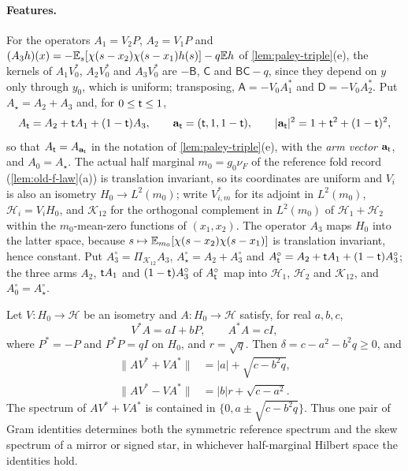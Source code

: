 \paragraph{Features.}
For the operators $A_1=V_2P$, $A_2=V_1P$ and
$(A_3h)(x)=-\mathbb E_s[\chi(s-x_2)\chi(s-x_1)h(s)]-q\mathbb E h$ of
\cref{lem:paley-triple}(e), the kernels of $A_1V_0^*$, $A_2V_0^*$ and $A_3V_0^*$
are $-\mathsf B$, $\mathsf C$ and $\mathsf B\mathsf C-q$, since they depend on
$y$ only through $y_0$, which is uniform; transposing, $\mathsf A=-V_0A_1^*$
and $\mathsf D=-V_0A_2^*$. Put $A_\star=A_2+A_3$ and, for $0\le\mathsf t\le1$,
\[
 A_\mathsf t=A_2+\mathsf t A_1+(1-\mathsf t)A_3,\qquad
 \mathbf a_\mathsf t=(\mathsf t,1,1-\mathsf t),\qquad
 |\mathbf a_\mathsf t|^2=1+\mathsf t^2+(1-\mathsf t)^2,
\]
so that $A_\mathsf t=A_{\mathbf a_\mathsf t}$ in the notation of
\cref{lem:paley-triple}(e), with the \emph{arm vector} $\mathbf a_\mathsf t$, and
$A_0=A_\star$. The actual half marginal $m_0=g_0\nu_F$ of the reference fold
record (\cref{lem:old-f-law}(a)) is translation invariant, so its coordinates
are uniform and $V_i$ is also an isometry $H_0\to L^2(m_0)$; write $V_{i,m}^*$
for its adjoint in $L^2(m_0)$, $\mathcal H_i=V_iH_0$, and $\mathcal K_{12}$ for
the orthogonal complement in $L^2(m_0)$ of $\mathcal H_1+\mathcal H_2$ within
the $m_0$-mean-zero functions of $(x_1,x_2)$. The operator $A_3$ maps $H_0$
into the latter space, because $s\mapsto\mathbb E_{m_0}[\chi(s-x_2)\chi(s-x_1)]$ is
translation invariant, hence constant. Put $A_3^\circ=\Pi_{\mathcal K_{12}}A_3$,
$A_\star^\circ=A_2+A_3^\circ$ and
$A^\circ_\mathsf t=A_2+\mathsf t A_1+(1-\mathsf t)A_3^\circ$; the three arms $A_2$,
$\mathsf t A_1$ and $(1-\mathsf t)A_3^\circ$ of $A^\circ_\mathsf t$ map into $\mathcal H_1$,
$\mathcal H_2$ and $\mathcal K_{12}$, and $A^\circ_0=A^\circ_\star$.

\begin{lemma}\label{lem:two-feature-spectrum}
Let $V\colon H_0\to\mathcal H$ be an isometry and $A\colon H_0\to\mathcal H$
satisfy, for real $a,b,c$,
\[
 V^*A=aI+bP,\qquad A^*A=cI,
\]
where $P^*=-P$ and $P^*P=qI$ on $H_0$, and $r=\sqrt q$. Then
$\delta=c-a^2-b^2q\ge0$, and
\begin{align*}
 \|AV^*+VA^*\|&=|a|+\sqrt{c-b^2q},\\
 \|AV^*-VA^*\|&=|b|r+\sqrt{c-a^2}.
\end{align*}
The spectrum of $AV^*+VA^*$ is contained in
$\{0,a\pm\sqrt{c-b^2q}\}$. Thus one pair of Gram identities determines
both the symmetric reference spectrum and the skew spectrum of a mirror or
signed star, in whichever half-marginal Hilbert space the identities hold.
\end{lemma}

